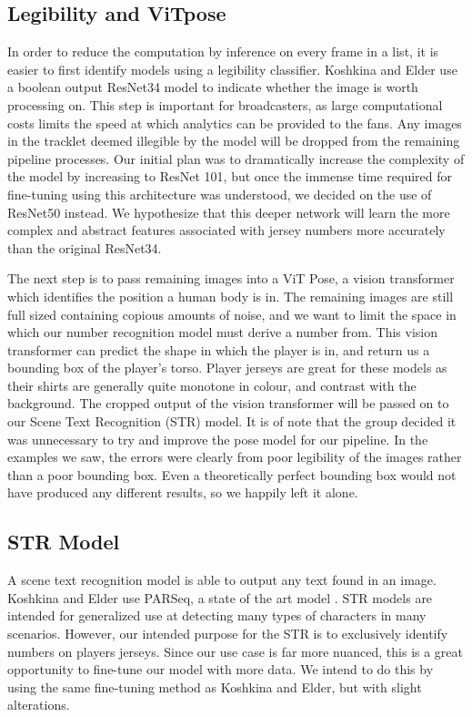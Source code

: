 \documentclass[11pt, letterpaper]{article}
\begin{document}
\subsection{Legibility and ViTpose}

In order to reduce the computation by inference on every frame in a list, it is easier to first identify models using a legibility classifier. Koshkina and Elder use a boolean output ResNet34 model to indicate whether the image is worth processing on. This step is important for broadcasters, as large computational costs limits the speed at which analytics can be provided to the fans. Any images in the tracklet deemed illegible by the model will be dropped from the remaining pipeline processes. Our initial plan was to dramatically increase the complexity of the model by increasing to ResNet 101, but once the immense time required for fine-tuning using this architecture was understood, we decided on the use of ResNet50 instead. We hypothesize that this deeper network will learn the more complex and abstract features associated with jersey numbers more accurately than the original ResNet34. 

The next step is to pass remaining images into a ViT Pose, a vision transformer which identifies the position a human body is in. The remaining images are still full sized containing copious amounts of noise, and we want to limit the space in which our number recognition model must derive a number from. This vision transformer can predict the shape in which the player is in, and return us a bounding box of the player's torso. Player jerseys are great for these models as their shirts are generally quite monotone in colour, and contrast with the background. The cropped output of the vision transformer will be passed on to our Scene Text Recognition (STR) model. It is of note that the group decided it was unnecessary to try and improve the pose model for our pipeline. In the examples we saw, the errors were clearly from poor legibility of the images rather than a poor bounding box. Even a theoretically perfect bounding box would not have produced any different results, so we happily left it alone.

\subsection{STR Model}

A scene text recognition model is able to output any text found in an image. Koshkina and Elder use PARSeq, a state of the art model \cite{parseq}. STR models are intended for generalized use at detecting many types of characters in many scenarios. However, our intended purpose for the STR is to exclusively identify numbers on players jerseys. Since our use case is far more nuanced, this is a great opportunity to fine-tune our model with more data. We intend to do this by using the same fine-tuning method as Koshkina and Elder, but with slight alterations.
\end{document}
